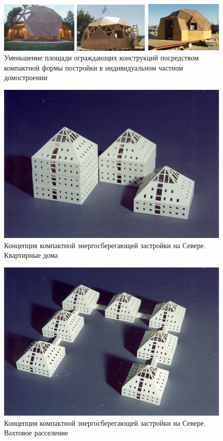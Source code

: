 \begin{figure}
    \centering
    \includegraphics[width=\textwidth]{assets/figures/st1ch03_ruexp_003.png}
    \caption{Уменьшение площади ограждающих конструкций посредством компактной формы постройки в индивидуальном частном домостроении}
    \label{fig:st1ch03_ruexp_003}
  \end{figure}
\cite{2003buee_Tabunshikov}

\begin{figure}
    \centering
    \includegraphics[width=\textwidth]{assets/figures/st1ch03_ruexp_004.png}
    \caption{Концепция компактной энергосберегающей застройки на Севере. Квартирные дома}
    \label{fig:st1ch03_ruexp_004}
  \end{figure}


\begin{figure}
    \centering
    \includegraphics[width=\textwidth]{assets/figures/st1ch03_ruexp_005.png}
    \caption{Концепция компактной энергосберегающей застройки на Севере. Вахтовое расселение}
    \label{fig:st1ch03_ruexp_005}
  \end{figure}



